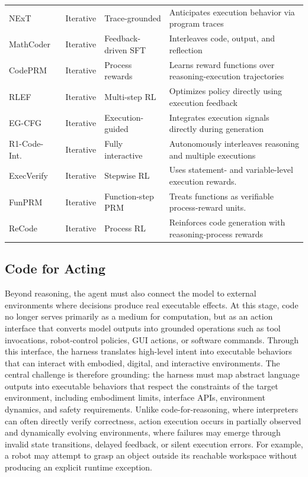 \begin{table}[t]
\begin{tabularx}{\textwidth}{p{2.8cm}p{2.2cm}p{3.1cm}X}
NExT~\cite{ni2024next} & Iterative & Trace-grounded & Anticipates execution behavior via program traces \\
MathCoder~\cite{wang2023mathcoder} & Iterative & Feedback-driven SFT & Interleaves code, output, and reflection \\
CodePRM~\cite{li2025codeprm} & Iterative & Process rewards & Learns reward functions over reasoning-execution trajectories \\
RLEF~\cite{gehring2024rlef} & Iterative & Multi-step RL & Optimizes policy directly using execution feedback \\
EG-CFG~\cite{lavon2025execution} & Iterative & Execution-guided & Integrates execution signals directly during generation \\
R1-Code-Int.~\cite{chen2025r1} & Iterative & Fully interactive & Autonomously interleaves reasoning and multiple executions \\
ExecVerify~\cite{tang2026execverifywhiteboxrlverifiable} & Iterative & Stepwise RL & Uses statement- and variable-level execution rewards. \\
FunPRM~\cite{zhang2026funprmfunctionasstepprocessreward} & Iterative & Function-step PRM & Treats functions as verifiable process-reward units. \\
ReCode~\cite{fan2026recodereinforcingcodegeneration} & Iterative & Process RL & Reinforces code generation with reasoning-process rewards \\
\bottomrule
\end{tabularx}
\label{tab:code_reasoning_systems}
\end{table}


\subsection{Code for Acting}
\label{subsec:acting}


Beyond reasoning, the agent must also connect the model to external environments where decisions produce real executable effects. At this stage, code no longer serves primarily as a medium for
computation, but as an action interface that converts model outputs into grounded operations such as tool invocations, robot-control policies, GUI actions, or software commands.
Through this interface, the harness translates high-level intent into executable behaviors that can interact with embodied, digital, and interactive environments.
The central challenge is therefore grounding: the harness must map abstract language outputs into executable behaviors that respect the constraints of the target environment, including embodiment limits, interface APIs, environment dynamics, and safety requirements. Unlike code-for-reasoning, where interpreters can often directly verify correctness, action execution occurs in partially observed and dynamically evolving environments, where failures may emerge through invalid state transitions, delayed feedback, or silent execution errors. For example, a robot may attempt to grasp an object outside its reachable workspace without producing an explicit runtime exception.


